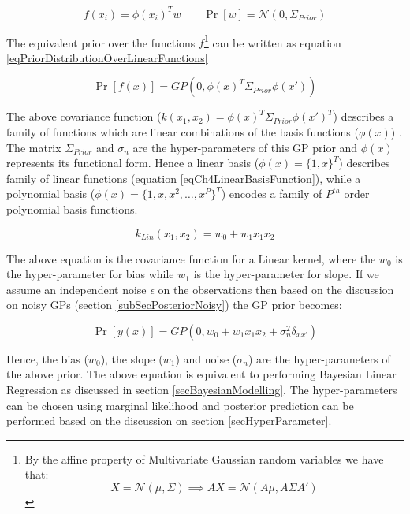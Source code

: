 \begin{equation}\label{eqBLRRevisited}
    f(x_{i}) = \phi(x_{i})^{T}w
\quad \quad \Pr[w] = \mathcal{N}(0, \Sigma_{Prior}) 
\end{equation}

The equivalent prior over the functions $f$\footnote{By the affine property of Multivariate Gaussian random variables we have that: $$X = \mathcal{N}(\mu, \Sigma) \implies AX = \mathcal{N}(A\mu, A\Sigma A')$$} can be written as equation \ref{eqPriorDistributionOverLinearFunctions}

\begin{equation}\label{eqPriorDistributionOverLinearFunctions}
    \Pr[f(x)] = GP(0, \phi(x)^{T} \Sigma_{Prior} \phi(x'))
\end{equation}

The above covariance function ($k(x_{1}, x_{2}) = \phi(x)^{T} \Sigma_{Prior} \phi(x')^{T}$) describes a family of functions which are linear combinations of the basis functions ($\phi(x)$) \cite{bishop2006pattern}. The matrix $\Sigma_{Prior}$ and $\sigma_{n}$ are the hyper-parameters of this GP prior and $\phi(x)$ represents its functional form. Hence a linear basis ($\phi(x) = \{1, x\}^{T}$) describes family of linear functions (equation \ref{eqCh4LinearBasisFunction}), while a polynomial basis ($\phi(x) = \{1, x, x^2, \ldots, x^P\}^{T}$) encodes a family of $P^{th}$ order polynomial basis functions.

\begin{equation}\label{eqCh4LinearBasisFunction}
k_{Lin}(x_{1}, x_{2}) = w_{0} + w_{1}x_{1}x_{2}
\end{equation}

The above equation is the covariance function for a Linear kernel, where the $w_{0}$ is the hyper-parameter for bias while $w_{1}$ is the hyper-parameter for slope. If we assume an independent noise $\epsilon$ on the observations then based on the discussion on noisy GPs (section \ref{subSecPosteriorNoisy}) the GP prior becomes:

\begin{equation}\label{eqNoisyPriorDistributionOverLinearFunctions}
    \Pr[y(x)] = GP(0, w_{0} + w_{1}x_{1}x_{2} + \sigma_{n}^2\delta_{xx'})
\end{equation}

Hence, the bias ($w_{0}$), the slope ($w_{1}$) and noise ($\sigma_{n}$) are the hyper-parameters of the above prior. The above equation is equivalent to performing Bayesian Linear Regression as discussed in section \ref{secBayesianModelling}. The hyper-parameters can be chosen using marginal likelihood and posterior prediction can be performed based on the discussion on section \ref{secHyperParameter}. 

